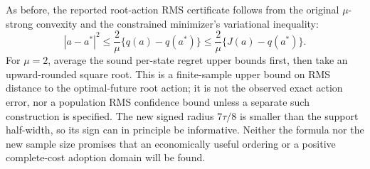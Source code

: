 As before, the reported root-action RMS certificate follows from
the original $\mu$-strong convexity and the constrained minimizer's
variational inequality:
\[
 |a-a^*|^2\le\frac{2}{\mu}\{q(a)-q(a^*)\}
       \le\frac{2}{\mu}\{J(a)-q(a^*)\}.
\]
For $\mu=2$, average the sound per-state regret upper bounds first,
then take an upward-rounded square root. This is a finite-sample upper
bound on RMS distance to the optimal-future root action; it is not
the observed exact action error, nor a population RMS confidence
bound unless a separate such construction is specified. The new signed
radius $7\tau/8$ is smaller than the support half-width, so its sign
can in principle be informative. Neither the formula nor the new
sample size promises that an economically useful ordering or a positive
complete-cost adoption domain will be found.
